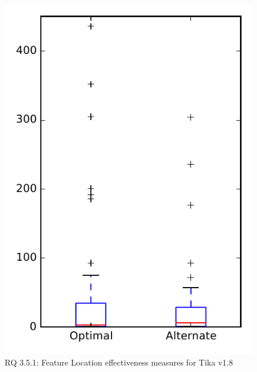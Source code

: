 
\begin{figure}
\centering
\includegraphics[height=0.4\textheight]{figures/combo/flt_rq1_tika}
\caption{RQ 3.5.1: Feature Location effectiveness measures for Tika v1.8}
\label{fig:flt:rq1:tika}
\end{figure}
